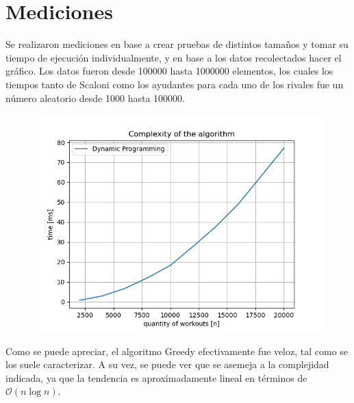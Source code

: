 \section{Mediciones}

Se realizaron mediciones en base a crear pruebas de distintos tamaños y tomar su tiempo de ejecución individualmente, y en base a los datos recolectados hacer el gráfico. Los datos fueron desde 100000 hasta 1000000 elementos, los cuales los tiempos tanto de Scaloni como los ayudantes para cada uno de los rivales fue un número aleatorio desde 1000 hasta 100000.

\begin{figure}[H]
	\centering
	\includegraphics[width=1\textwidth]{img/graphic.png}
\end{figure}

Como se puede apreciar, el algoritmo Greedy efectivamente fue veloz, tal como se los suele caracterizar. A su vez, se puede ver que se asemeja a la complejidad indicada, ya que la tendencia es aproximadamente lineal en términos de $\mathcal{O}\left(n \log n\right)$.
